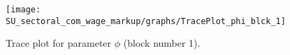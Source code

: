 \begin{figure}[H]
\centering
  \texttt{[image: SU\_sectoral\_com\_wage\_markup/graphs/TracePlot\_phi\_blck\_1]}\\
    \caption{Trace plot for parameter ${\phi}$ (block number 1).}
\end{figure}
